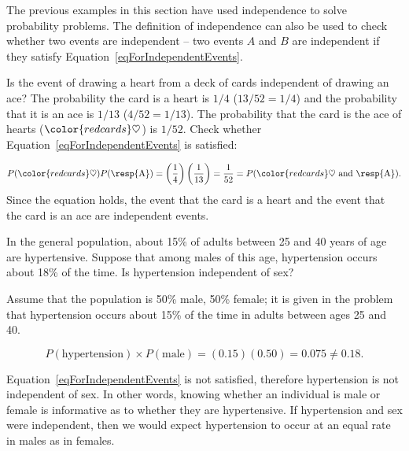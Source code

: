 The previous examples in this section have used independence to solve probability problems. The definition of independence can also be used to check whether two events are independent -- two events $A$ and $B$ are independent if they satisfy Equation~\eqref{eqForIndependentEvents}.

\begin{examplewrap}
\begin{nexample}{Is the event of drawing a heart from a deck of cards independent of drawing an ace?}
The probability the card is a heart is $1/4$ ($13/52=1/4$) and the probability that it is an ace is $1/13$ ($4/52=1/13$). The probability that the card is the ace of hearts (${\color{redcards}\heartsuit}$) is $1/52$. Check whether Equation~\ref{eqForIndependentEvents} is satisfied:

\begin{align*}
P({\color{redcards}\heartsuit}) P(\text{\resp{A}}) = \left(\frac{1}{4} \right) \left( \frac{1}{13} \right) = \frac{1}{52} 
= P({\color{redcards}\heartsuit}\text{ and \resp{A}}).
\end{align*}
Since the equation holds, the event that the card is a heart and the event that the card is an ace are independent events.
\end{nexample}
\end{examplewrap}

\begin{examplewrap}
\begin{nexample}
 {In the general population, about 15\% of adults between 25 and 40  years of age are hypertensive.  Suppose that among males of this age, hypertension occurs about 18\% of the time.  Is hypertension independent of sex?}\label{hypertensionIndEx}%

Assume that the population is 50\% male, 50\% female; it is given in the problem that hypertension occurs about 15\% of the time in adults between ages 25 and 40. 

\[P(\text{hypertension}) \times P(\text{male}) = (0.15)(0.50) = 0.075 \neq 0.18.\] 

Equation~\ref{eqForIndependentEvents} is not satisfied, therefore hypertension is not independent of sex. In other words, knowing whether an individual is male or female is informative as to whether they are hypertensive. If hypertension and sex were independent, then we would expect hypertension to occur at an equal rate in males as in females.
\end{nexample}
\end{examplewrap}


